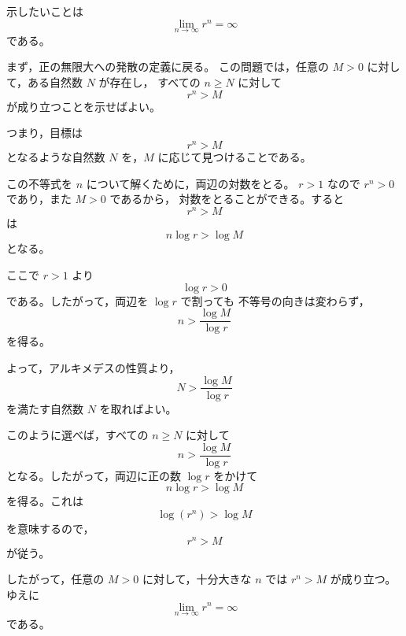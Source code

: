 \begin{strategy}
	示したいことは
	\[
		\lim_{n\to\infty}r^n=\infty
	\]
	である。

	まず，正の無限大への発散の定義に戻る。
	この問題では，任意の $M>0$ に対して，ある自然数 $N$ が存在し，
	すべての $n\geq N$ に対して
	\[
		r^n>M
	\]
	が成り立つことを示せばよい。

	つまり，目標は
	\[
		r^n>M
	\]
	となるような自然数 $N$ を，$M$ に応じて見つけることである。

	この不等式を $n$ について解くために，両辺の対数をとる。
	$r>1$ なので $r^n>0$ であり，また $M>0$ であるから，
	対数をとることができる。すると
	\[
		r^n>M
	\]
	は
	\[
		n\log r>\log M
	\]
	となる。

	ここで $r>1$ より
	\[
		\log r>0
	\]
	である。したがって，両辺を $\log r$ で割っても
	不等号の向きは変わらず，
	\[
		n>\frac{\log M}{\log r}
	\]
	を得る。

	よって，アルキメデスの性質より，
	\[
		N>\frac{\log M}{\log r}
	\]
	を満たす自然数 $N$ を取ればよい。

	このように選べば，すべての $n\geq N$ に対して
	\[
		n>\frac{\log M}{\log r}
	\]
	となる。したがって，両辺に正の数 $\log r$ をかけて
	\[
		n\log r>\log M
	\]
	を得る。これは
	\[
		\log(r^n)>\log M
	\]
	を意味するので，
	\[
		r^n>M
	\]
	が従う。

	したがって，任意の $M>0$ に対して，十分大きな $n$ では
	$r^n>M$ が成り立つ。ゆえに
	\[
		\lim_{n\to\infty}r^n=\infty
	\]
	である。
\end{strategy}